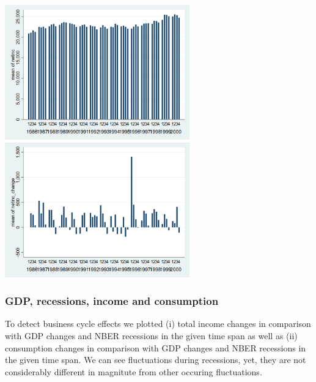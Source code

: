 \documentclass[12pt,a4paper]{article}
\begin{document}
\begin{center}
\includegraphics[width=8cm]{netinc_quarterly.png}
\includegraphics[width=8cm]{netinc_change_quarterly.png}\\
\end{center}

\subsubsection*{GDP, recessions, income and consumption}
To detect business cycle effects we plotted (i) total income changes in comparison with GDP changes and NBER recessions in the given time span as well as (ii) consumption changes in comparison with GDP changes and NBER recessions in the given time span. We can see fluctuations during recessions, yet, they are not considerably different in magnitute from other occuring fluctuations.
\end{document}
